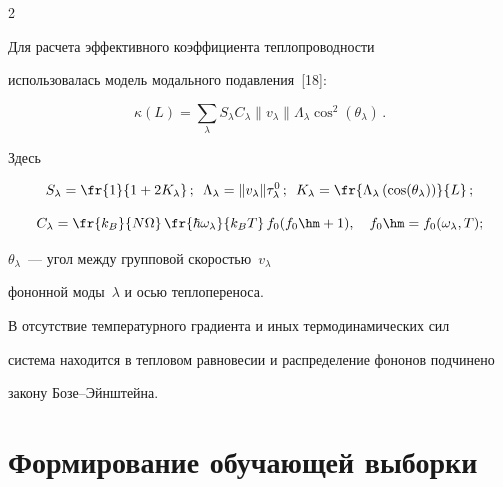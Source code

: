 \begin{multicols}{2}
\begin{figure}
\begin{center}
\end{center}


\vspace*{-11pt}




     \end{figure}


     


    Для расчета эффективного коэффициента теп\-ло\-про\-вод\-ности 


использовалась модель модального подавления~[18]:


    $$


    \kappa(L)=\sum\limits_\lambda S_\lambda C_\lambda \| v_\lambda \| 


\Lambda_\lambda \cos^2\left(\theta_\lambda\right)\,.


    $$


Здесь 


$$


S_\lambda=\fr{1}{1+2K_\lambda}\,;\enskip 


\Lambda_\lambda= \| v_\lambda \| \tau^0_\lambda\,;\enskip 


K_\lambda=\fr{ \Lambda_\lambda \left(\cos(\theta_\lambda)\right)}{L}\,;


$$ 


\begin{equation*}


C_\lambda=\fr{k_B}{N\Omega}\,\fr{\hbar \omega_\lambda}{k_BT}\, 


f_0(f_0\hm+1),\quad


f_0\hm=f_0(\omega_\lambda, T);


\end{equation*} 


$\theta_\lambda$~--- угол между групповой скоростью~$v_\lambda$ 


фононной моды~$\lambda$ и осью теплопереноса.


    


    В отсутствие температурного градиента и иных термодинамических сил 


система находится в тепловом равновесии и распределение фононов подчинено 


закону Бо\-зе--Эйн\-штейна.





\section{Формирование обучающей выборки}






\end{multicols}
